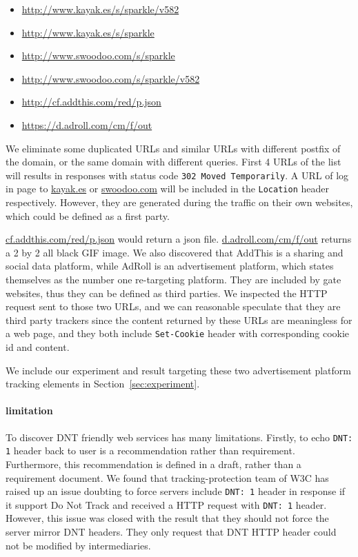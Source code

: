 \documentclass{sig-alternate}
\begin{document}
\begin{itemize}
\item \url{http://www.kayak.es/s/sparkle/v582}
\item \url{http://www.kayak.es/s/sparkle}
\item \url{http://www.swoodoo.com/s/sparkle}
\item \url{http://www.swoodoo.com/s/sparkle/v582}
\item \url{http://cf.addthis.com/red/p.json}
\item \url{https://d.adroll.com/cm/f/out}
\end{itemize}

We eliminate some duplicated URLs and similar URLs with different postfix of the domain, or the same domain with different queries. First 4 URLs of the list will results in responses with status code \verb|302 Moved Temporarily|. A URL of log in page to \url{kayak.es} or \url{swoodoo.com} will be included in the \texttt{Location} header respectively. However, they are generated during the traffic on their own websites, which could be defined as a first party.

\url{cf.addthis.com/red/p.json} would return a json file. \url{d.adroll.com/cm/f/out} returns a 2 by 2 all black GIF image. We also discovered that AddThis is a sharing and social data platform, while AdRoll is an advertisement platform, which states themselves as the number one re-targeting platform. They are included by gate websites, thus they can be defined as third parties. We inspected the HTTP request sent to those two URLs, and we can reasonable speculate that they are third party trackers since the content returned by these URLs are meaningless for a web page, and they both include \texttt{Set-Cookie} header with corresponding cookie id and content.

We include our experiment and result targeting these two advertisement platform tracking elements in Section~\ref{sec:experiment}. 

\paragraph{limitation}
To discover DNT friendly web services has many limitations. Firstly, to echo \verb|DNT: 1| header back to user is a recommendation rather than requirement. Furthermore, this recommendation is defined in a draft\cite{dntdraft}, rather than a requirement document. We found that tracking-protection team of W3C has raised up an issue doubting to force servers include \verb|DNT: 1| header in response if it support Do Not Track and received a HTTP request with \verb|DNT: 1| header. However, this issue was closed with the result that they should not force the server mirror DNT headers. They only request that DNT HTTP header could not be modified by intermediaries.
\end{document}

